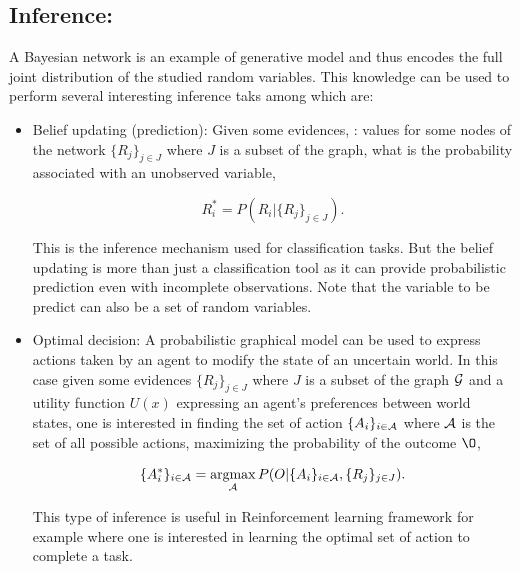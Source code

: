 \documentclass[a4paper,11pt]{report}
\begin{document}
    \subsection{Inference:}
      \label{subsec:PGMs/BN/Inference}
      
			A Bayesian network is an example of generative model and thus encodes the full joint distribution of the studied random variables. This knowledge can be used to perform several interesting inference taks among which are:\\
				
     \begin{itemize}
        \item Belief updating (\ie prediction): Given some evidences, \ie: values for some nodes of the network $\{R_{j}\}_{j \in J}$ where $J$ is a subset of the graph, what is the probability associated with an unobserved variable,
        
        \begin{equation}
					R_{i}^{\ast}=P(R_{i}|\{R_{j}\}_{j \in J}).
					\label{eq:BN inference BEL}
				\end{equation}
				
				This is the inference mechanism used for classification tasks. But the belief updating is more than just a classification tool as it can provide probabilistic prediction even with incomplete observations. Note that the variable to be predict can also be a set of random variables.\\
				
				\item Optimal decision: A probabilistic graphical model can be used to express actions taken by an agent to modify the state of an uncertain world. In this case given some evidences $\{R_{j}\}_{j \in J}$ where $J$ is a subset of the graph $\mathcal{G}$ and a utility function $U(x)$ expressing an agent's preferences between world states, one is interested in finding the set of action $\{A_{i}\}_{i \in \mathcal{A}}$ where $\mathcal{A}$ is the set of all possible actions, maximizing the probability of the outcome $\O$,

				\begin{equation}
					\{A_{i}^{\ast}\}_{i \in \mathcal{A}} =\mathop{\rm argmax}_{\mathcal{A}} P(O | \{A_{i}\}_{i \in \mathcal{A}}, \{R_{j}\}_{j \in J}).
					\label{eq:BN inference optimal decision}
				\end{equation}
				
				This type of inference is useful in Reinforcement learning framework for example where one is interested in learning the optimal set of action to complete a task.\\
				

\end{itemize}
\end{document}
